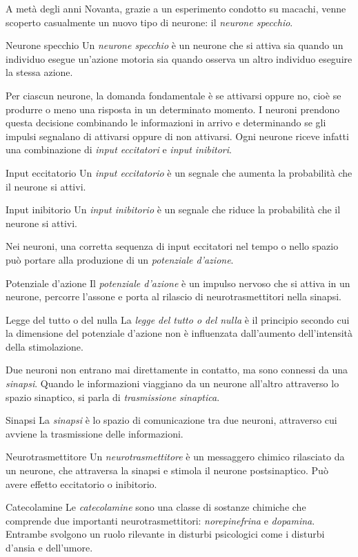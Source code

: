 \documentclass[a4paper]{article}
\begin{document}
A metà degli anni Novanta, grazie a un esperimento condotto su macachi, venne scoperto casualmente un nuovo tipo di neurone: il \emph{neurone specchio}.
\begin{snippetdefinition}{Neurone specchio}
    Un \emph{neurone specchio} è un neurone che si attiva sia quando un individuo esegue un'azione motoria sia quando osserva un altro individuo eseguire la stessa azione.
\end{snippetdefinition}
Per ciascun neurone, la domanda fondamentale è se attivarsi oppure no, cioè se produrre o meno una risposta in un determinato momento.
I neuroni prendono questa decisione combinando le informazioni in arrivo e determinando se gli impulsi segnalano di attivarsi oppure di non attivarsi. Ogni neurone riceve infatti una combinazione di \emph{input eccitatori} e \emph{input inibitori}.
\begin{snippetdefinition}{Input eccitatorio}
    Un \emph{input eccitatorio} è un segnale che aumenta la probabilità che il neurone si attivi.
\end{snippetdefinition}
\begin{snippetdefinition}{Input inibitorio}
    Un \emph{input inibitorio} è un segnale che riduce la probabilità che il neurone si attivi.
\end{snippetdefinition}
Nei neuroni, una corretta sequenza di input eccitatori nel tempo o nello spazio può portare alla produzione di un \emph{potenziale d'azione}.
\begin{snippetdefinition}{Potenziale d'azione}
    Il \emph{potenziale d'azione} è un impulso nervoso che si attiva in un neurone, percorre l'assone e porta al rilascio di neurotrasmettitori nella sinapsi.
\end{snippetdefinition}
\begin{snippetdefinition}{Legge del tutto o del nulla}
    La \emph{legge del tutto o del nulla} è il principio secondo cui la dimensione del potenziale d'azione non è influenzata dall'aumento dell'intensità della stimolazione.
\end{snippetdefinition}
Due neuroni non entrano mai direttamente in contatto, ma sono connessi da una \emph{sinapsi}. Quando le informazioni viaggiano da un neurone all'altro attraverso lo spazio sinaptico, si parla di \emph{trasmissione sinaptica}.
\begin{snippetdefinition}{Sinapsi}
    La \emph{sinapsi} è lo spazio di comunicazione tra due neuroni, attraverso cui avviene la trasmissione delle informazioni.
\end{snippetdefinition}
\begin{snippetdefinition}{Neurotrasmettitore}
    Un \emph{neurotrasmettitore} è un messaggero chimico rilasciato da un neurone, che attraversa la sinapsi e stimola il neurone postsinaptico. Può avere effetto eccitatorio o inibitorio.
\end{snippetdefinition}
\begin{snippetexample}{Catecolamine}
    Le \emph{catecolamine} sono una classe di sostanze chimiche che comprende due importanti neurotrasmettitori: \emph{norepinefrina} e \emph{dopamina}. Entrambe svolgono un ruolo rilevante in disturbi psicologici come i disturbi d'ansia e dell'umore.
\end{snippetexample}
\end{document}
